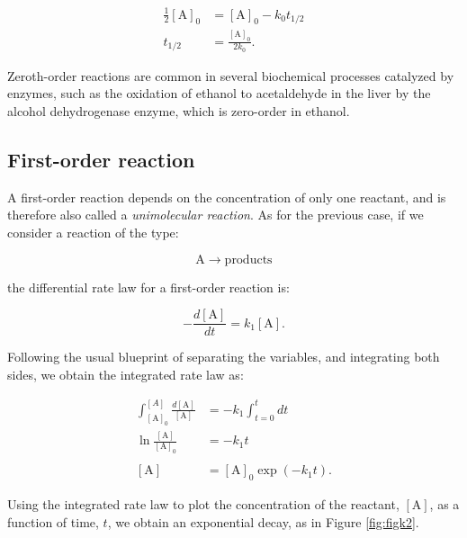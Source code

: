 \documentclass[
  9pt,
]{extbook}
\theoremstyle{definition}
\theoremstyle{definition}
\theoremstyle{definition}
\theoremstyle{definition}
\theoremstyle{remark}
\begin{document}
\begin{equation}
\begin{aligned}
\frac{1}{2}[\mathrm{A}]_0 &=[\mathrm{A}]_0 -k_0 t_{1/2} \\
t_{1/2} &= \frac{[\mathrm{A}]_0}{2k_0}.
\end{aligned}
\label{eq:kin4}
\end{equation}

Zeroth-order reactions are common in several biochemical processes catalyzed by enzymes, such as the oxidation of ethanol to acetaldehyde in the liver by the alcohol dehydrogenase enzyme, which is zero-order in ethanol.

\subsection{First-order reaction}\label{first-order-reaction}

A first-order reaction depends on the concentration of only one reactant, and is therefore also called a \emph{unimolecular reaction}. As for the previous case, if we consider a reaction of the type:

\begin{equation}
\mathrm{A}\rightarrow \text{products}
\end{equation}

the differential rate law for a first-order reaction is:

\begin{equation}
- \frac{d[\mathrm{A}]}{dt}=k_1 [\mathrm{A}].
\label{eq:kin6}
\end{equation}

Following the usual blueprint of separating the variables, and integrating both sides, we obtain the integrated rate law as:

\begin{equation}
\begin{aligned}
\int_{[\mathrm{A}]_0}^{[A]} \frac{d[\mathrm{A}]}{[\mathrm{A}]} &= -k_1 \int_{t=0}^{t} dt \\
\ln \frac{[\mathrm{A}]}{[\mathrm{A}]_0}&=-k_1 t\\ \\
[\mathrm{A}] &= [\mathrm{A}]_0 \exp(-k_1 t).
\end{aligned}
\label{eq:kin7}
\end{equation}

Using the integrated rate law to plot the concentration of the reactant, \([\mathrm{A}]\), as a function of time, \(t\), we obtain an exponential decay, as in Figure \ref{fig:figk2}.
\end{document}
